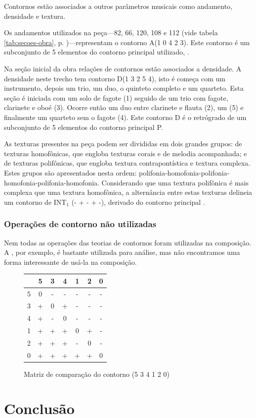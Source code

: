 Contornos estão associados a outros parâmetros musicais como
andamento, densidade e textura.

Os andamentos utilizados na peça---82, 66, 120, 108 e 112 (vide tabela
\ref{tab:secoes-obra}, p. \pageref{tab:secoes-obra})---representam o
contorno A(1 0 4 2 3). Este contorno é um subconjunto de 5 elementos
do contorno principal utilizado, \contpr{}.

Na seção inicial da obra relações de contornos estão associados a
densidade. A densidade neste trecho tem contorno D(1 3 2 5 4), isto é
começa com um instrumento, depois um trio, um duo, o quinteto completo
e um quarteto. Esta seção é iniciada com um solo de fagote (1) seguido
de um trio com fagote, clarinete e oboé (3). Ocorre então um duo entre
clarinete e flauta (2), um  (5) e finalmente um quarteto
sem o fagote (4). Este contorno D é o retrógrado de um subconjunto de
5 elementos do contorno principal P.

As texturas presentes na peça podem ser divididas em dois grandes
grupos: de texturas homofônicas, que engloba texturas corais e de
melodia acompanhada; e de texturas polifônicas, que engloba textura
contrapontística e textura complexa. Estes grupos são apresentados
nesta ordem:
polifonia-homofonia-polifonia-homofonia-polifonia-homofonia. Considerando
que uma textura polifônica é mais complexa que uma textura homofônica,
a alternância entre estas texturas delineia um contorno de INT$_1$ (-
+ - + -), derivado do contorno principal \contpr{}.

\subsection{Operações de contorno não utilizadas}
\label{sec:oper-de-cont}

Nem todas as operações das teorias de contornos foram utilizadas na
composição. A , por exemplo, é bastante utilizada para
análise, mas não encontramos uma forma interessante de usá-la na
composição.

\begin{figure}
  \centering
  \begin{tabular}{r|cccccc}
      & 5 & 3 & 4 & 1 & 2 & 0 \\
      \hline
    5 & 0 & - & - & - & - & - \\
    3 & + & 0 & + & - & - & - \\
    4 & + & - & 0 & - & - & - \\
    1 & + & + & + & 0 & + & - \\
    2 & + & + & + & - & 0 & - \\
    0 & + & + & + & + & + & 0
  \end{tabular}
  \caption{Matriz de comparação do contorno (5 3 4 1 2 0)}
  \label{fig:matriz-534120}
\end{figure}


\chapter{Conclusão}
\label{cha:conclusao}
